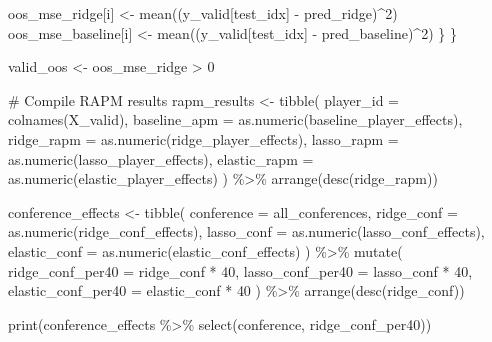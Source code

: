 \documentclass[
  letterpaper,
  DIV=11,
  numbers=noendperiod]{scrartcl}
\newenvironment{Shaded}{\begin{snugshade}}{\end{snugshade}}
\newcommand{\AttributeTok}[1]{\textcolor[rgb]{0.40,0.45,0.13}{#1}}
\newcommand{\CommentTok}[1]{\textcolor[rgb]{0.37,0.37,0.37}{#1}}
\newcommand{\DecValTok}[1]{\textcolor[rgb]{0.68,0.00,0.00}{#1}}
\newcommand{\FunctionTok}[1]{\textcolor[rgb]{0.28,0.35,0.67}{#1}}
\newcommand{\NormalTok}[1]{\textcolor[rgb]{0.00,0.23,0.31}{#1}}
\newcommand{\OtherTok}[1]{\textcolor[rgb]{0.00,0.23,0.31}{#1}}
\newcommand{\SpecialCharTok}[1]{\textcolor[rgb]{0.37,0.37,0.37}{#1}}
\begin{document}
\begin{Shaded}
\begin{Highlighting}[]
\NormalTok{    oos\_mse\_ridge[i] }\OtherTok{\textless{}{-}} \FunctionTok{mean}\NormalTok{((y\_valid[test\_idx] }\SpecialCharTok{{-}}\NormalTok{ pred\_ridge)}\SpecialCharTok{\^{}}\DecValTok{2}\NormalTok{)}
\NormalTok{    oos\_mse\_baseline[i] }\OtherTok{\textless{}{-}} \FunctionTok{mean}\NormalTok{((y\_valid[test\_idx] }\SpecialCharTok{{-}}\NormalTok{ pred\_baseline)}\SpecialCharTok{\^{}}\DecValTok{2}\NormalTok{)}
\NormalTok{  \}}
\NormalTok{\}}

\NormalTok{valid\_oos }\OtherTok{\textless{}{-}}\NormalTok{ oos\_mse\_ridge }\SpecialCharTok{\textgreater{}} \DecValTok{0}

\CommentTok{\# Compile RAPM results}
\NormalTok{rapm\_results }\OtherTok{\textless{}{-}} \FunctionTok{tibble}\NormalTok{(}
  \AttributeTok{player\_id =} \FunctionTok{colnames}\NormalTok{(X\_valid),}
  \AttributeTok{baseline\_apm =} \FunctionTok{as.numeric}\NormalTok{(baseline\_player\_effects),}
  \AttributeTok{ridge\_rapm =} \FunctionTok{as.numeric}\NormalTok{(ridge\_player\_effects),}
  \AttributeTok{lasso\_rapm =} \FunctionTok{as.numeric}\NormalTok{(lasso\_player\_effects),}
  \AttributeTok{elastic\_rapm =} \FunctionTok{as.numeric}\NormalTok{(elastic\_player\_effects)}
\NormalTok{) }\SpecialCharTok{\%\textgreater{}\%}
  \FunctionTok{arrange}\NormalTok{(}\FunctionTok{desc}\NormalTok{(ridge\_rapm))}

\NormalTok{conference\_effects }\OtherTok{\textless{}{-}} \FunctionTok{tibble}\NormalTok{(}
  \AttributeTok{conference =}\NormalTok{ all\_conferences,}
  \AttributeTok{ridge\_conf =} \FunctionTok{as.numeric}\NormalTok{(ridge\_conf\_effects),}
  \AttributeTok{lasso\_conf =} \FunctionTok{as.numeric}\NormalTok{(lasso\_conf\_effects),}
  \AttributeTok{elastic\_conf =} \FunctionTok{as.numeric}\NormalTok{(elastic\_conf\_effects)}
\NormalTok{) }\SpecialCharTok{\%\textgreater{}\%}
  \FunctionTok{mutate}\NormalTok{(}
    \AttributeTok{ridge\_conf\_per40 =}\NormalTok{ ridge\_conf }\SpecialCharTok{*} \DecValTok{40}\NormalTok{,}
    \AttributeTok{lasso\_conf\_per40 =}\NormalTok{ lasso\_conf }\SpecialCharTok{*} \DecValTok{40}\NormalTok{,}
    \AttributeTok{elastic\_conf\_per40 =}\NormalTok{ elastic\_conf }\SpecialCharTok{*} \DecValTok{40}
\NormalTok{  ) }\SpecialCharTok{\%\textgreater{}\%}
  \FunctionTok{arrange}\NormalTok{(}\FunctionTok{desc}\NormalTok{(ridge\_conf))}

\FunctionTok{print}\NormalTok{(conference\_effects }\SpecialCharTok{\%\textgreater{}\%} \FunctionTok{select}\NormalTok{(conference, ridge\_conf\_per40))}


\end{Highlighting}
\end{Shaded}
\end{document}
